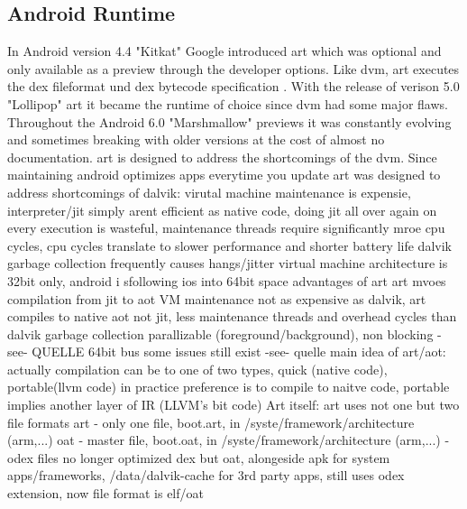 \subsection{Android Runtime} \label{subsection:android-art}
In Android version 4.4 "Kitkat" Google introduced \gls{art} which was optional and only available as a preview through the developer options.
Like \gls{dvm}, \gls{art} executes the \gls{dex} fileformat und \gls{dex} bytecode specification \cite{androidArt}.
With the release of verison 5.0 "Lollipop" \gls{art} it became the runtime of choice since \gls{dvm} had some major flaws.
Throughout the Android 6.0 "Marshmallow" previews it was constantly evolving and sometimes breaking with older versions at the cost of almost no documentation.
\newline
\gls{art} is designed to address the shortcomings of the \gls{dvm}.
Since maintaining
 android optimizes apps everytime you update\newline
art was designed to address shortcomings of dalvik:
virutal machine maintenance is expensie, interpreter/jit simply arent efficient as native code, doing jit all over again on every execution is wasteful, maintenance threads require significantly mroe cpu cycles, cpu cycles translate to slower performance and shorter battery life
dalvik garbage collection frequently causes hangs/jitter
virtual machine architecture is 32bit only, android i sfollowing ios into 64bit space\newline
advantages of art
art mvoes compilation from \gls{jit} to \gls{aot}
VM maintenance not as expensive as dalvik, art compiles to native \gls{aot} not \gls{jit}, less maintenance threads and overhead cycles than dalvik
garbage collection parallizable (foreground/background), non blocking -see- QUELLE
64bit bus some issues still exist -see- quelle\newline
main idea of art/aot:
actually compilation can be to one of two types, quick (native code), portable(llvm code)
in practice preference is to compile to naitve code, portable implies another layer of IR (LLVM's bit code)\newline
Art itself:
art uses not one but two file formats
art - only one file, boot.art, in /syste/framework/architecture (arm,...)
oat - master file, boot.oat, in /syste/framework/architecture (arm,...) - odex files no longer optimized dex but oat, alongeside apk for system apps/frameworks, /data/dalvik-cache for 3rd party apps, still uses odex extension, now file format is elf/oat\newline
